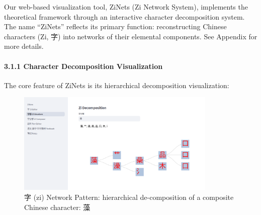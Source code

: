 \documentclass[
  11pt,
  letterpaper,
]{article}
\begin{document}
Our web-based visualization tool, ZiNets (Zi Network System), implements
the theoretical framework through an interactive character decomposition
system. The name ``ZiNets'' reflects its primary function:
reconstructing Chinese characters (Zi, 字) into networks of their
elemental components. See Appendix for more details.

  
\paragraph{3.1.1 Character Decomposition
Visualization}\label{character-decomposition-visualization}

The core feature of ZiNets is its hierarchical decomposition
visualization:

\begin{figure}
  \centering
  \includegraphics[width=0.85\textwidth]{./images/app_decomposing-zi-2.png}
  \caption{字 (zi) Network Pattern: hierarchical de-composition of a composite Chinese character: 藻}
  \end{figure}
  
\end{document}
